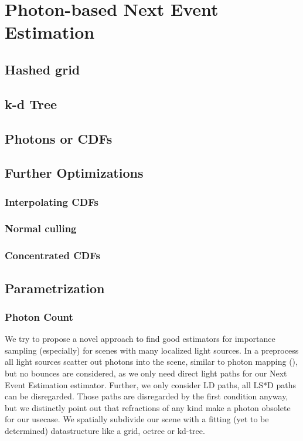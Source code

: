 
\chapter{Photon-based Next Event Estimation}
\label{ch:PNEE}

\section{Hashed grid}

\section{k-d Tree}

\section{Photons or CDFs}

\section{Further Optimizations}

\subsection{Interpolating CDFs}

\subsection{Normal culling}

\subsection{Concentrated CDFs}

\section{Parametrization}

\subsection{Photon Count}


We try to propose a novel approach to find good estimators for importance sampling (especially) for scenes with many localized light sources. In a preprocess all light sources scatter out photons into the scene, similar to photon mapping (\cite{jensen2001realistic}), but no bounces are considered, as we only need direct light paths for our Next Event Estimation estimator. Further, we only consider LD paths, all LS*D paths can be disregarded. Those paths are disregarded by the first condition anyway, but we distinctly point out that refractions of any kind make a photon obsolete for our usecase. We spatially subdivide our scene with a fitting (yet to be determined) datastructure like a grid, octree or kd-tree. 

